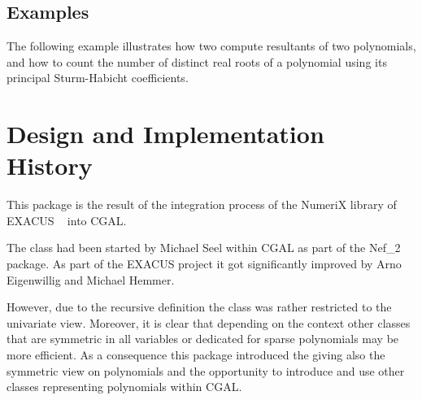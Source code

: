 \subsection{Examples}

The following example illustrates how two compute resultants of two
polynomials, and how to count the number of distinct real roots
of a polynomial using its principal Sturm-Habicht coefficients.


\section{Design and Implementation History}

This package is the result of the integration process of the NumeriX library 
of EXACUS ~\cite{beh+-eeeafcs-05} into CGAL.

The class  had been started by Michael Seel within 
CGAL as part of the Nef\_2 package. As part of the EXACUS 
project it got significantly improved by Arno Eigenwillig and Michael Hemmer. 

However, due to the recursive definition the class was rather restricted to the 
univariate view. Moreover, it is clear that depending on the context 
other classes that are symmetric in all variables or dedicated 
for sparse polynomials may be more efficient. As a consequence this package 
introduced the  giving also
the symmetric view on polynomials and the opportunity to introduce and use
other classes representing polynomials within CGAL. 

 


 
